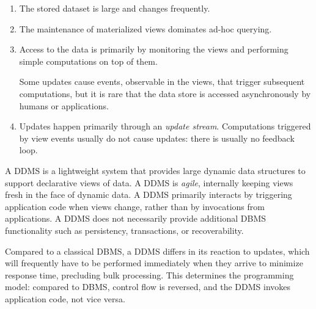 \begin{enumerate}
\item
The stored dataset is large and changes frequently.

\item 
The
maintenance of materialized views dominates ad-hoc querying.

\item
Access to the data is primarily by monitoring the views and performing
simple computations on top of them.

%
%

Some updates cause events, observable in the views, that trigger subsequent
computations, but it is rare that the data store is accessed asynchronously by
humans or applications.

\item
Updates happen primarily through an {\em update stream}\/. Computations
triggered by view events usually do not cause updates: there is usually no
feedback loop.

\end{enumerate}

\noindent A DDMS is a lightweight system that provides large dynamic data
structures to support declarative views of data. A DDMS is \textit{agile},
internally keeping views fresh in the face of dynamic data. A DDMS primarily interacts by
triggering application code when views change, rather than by invocations from applications.
A DDMS does not necessarily provide additional DBMS functionality such as
persistency, transactions, or recoverability.




Compared to a classical DBMS, a DDMS differs in its reaction to updates,
which will frequently have to be performed immediately when they arrive to
minimize response time, precluding bulk processing. This determines the
programming model: compared to DBMS, control flow is reversed, and the DDMS
invokes application code, not vice versa. 


